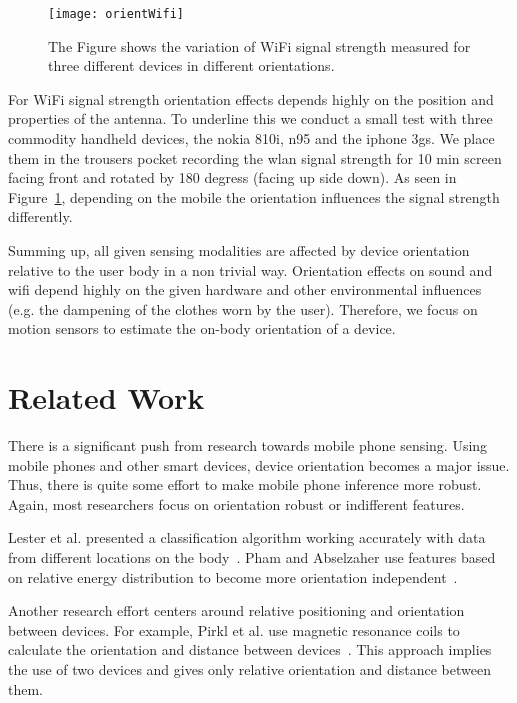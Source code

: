 \begin{figure}[t]
  \begin{center}
  \texttt{[image: orientWifi]}
	\end{center}
\caption[Wifi signal strength variations]{The Figure shows the variation of WiFi signal strength
 measured for three different devices in different orientations.}
\label{fig:orientation_damping}
\end{figure}

For WiFi signal strength orientation effects depends highly on the position and properties of the antenna. 
To underline this we conduct a small test with three commodity handheld devices, the nokia 810i, n95 and
the iphone 3gs. We place them in the trousers pocket recording the
wlan signal strength for 10 min screen facing front and rotated by 180
degress (facing up side down). As seen in
Figure~\ref{fig:orientation_damping}, depending on the mobile the
orientation influences the signal strength differently.

Summing up, all given sensing modalities are affected by device
orientation relative to the user body in a non trivial way. Orientation effects
on sound and wifi depend highly on the given hardware and other environmental 
influences (e.g. the dampening of the clothes worn by the user). Therefore, we focus on motion sensors to estimate the
on-body orientation of a device.

\section{Related Work}
\label{sec:orient:related}

There is a significant push from research towards mobile phone sensing. 
Using mobile phones and other smart devices, device orientation becomes a major issue. Thus, there is quite some effort to make mobile phone inference more robust. 
Again, most researchers focus on orientation robust or indifferent features. 

Lester et al. presented a classification algorithm working accurately with data from different locations on the body~\cite{Lester:2006p31}. Pham and Abselzaher use features based on relative energy distribution to become more orientation independent~\cite{Pham:2008p146}. 

Another research effort centers around relative positioning and orientation between devices. For example, Pirkl et al. use magnetic resonance coils to calculate the orientation and distance between devices~\cite{pirkl}. This approach implies the use of two devices and gives only relative orientation and distance between them.


